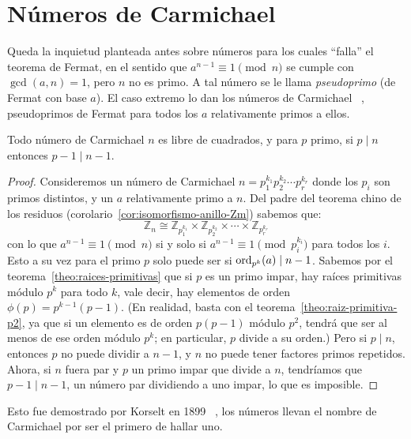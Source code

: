 \section{Números de Carmichael}
\label{sec:Carmichael}

  Queda la inquietud planteada antes
  sobre números para los cuales ``falla''
  el teorema de Fermat,%
  en el sentido que \(a^{n - 1} \equiv 1 \pmod{n}\)
  se cumple con \(\gcd(a, n) = 1\),
  pero \(n\) no es primo.
  A tal número se le llama \emph{pseudoprimo}%
  (de Fermat con base \(a\)).
  El caso extremo lo dan los números de Carmichael~%
    \cite{carmichael10:_note_new_number_theor_funct},
  pseudoprimos de Fermat
  para todos los \(a\) relativamente primos a ellos.

  \begin{theorem}
    Todo número de Carmichael \(n\) es libre de cuadrados,
    y para \(p\) primo,
    si \(p \mid n\) entonces \(p - 1 \mid n - 1\).
  \end{theorem}
  \begin{proof}
    Consideremos un número de Carmichael
    \(n = p_1^{k_1} p_2^{k_2} \dotsm p_r^{k_r}\)
    donde los \(p_i\) son primos distintos,
    y un \(a\) relativamente primo a \(n\).
    Del padre del teorema chino de los residuos%
    (corolario~\ref{cor:isomorfismo-anillo-Zm})
    sabemos que:
    \begin{equation*}
      \mathbb{Z}_n
	\cong \mathbb{Z}_{p_1^{k_1}}
		\times \mathbb{Z}_{p_2^{k_2}}
		\times \dotsb
		\times \mathbb{Z}_{p_r^{k_r}}
    \end{equation*}
    con lo que \(a^{n - 1} \equiv 1 \pmod{n}\)
    si y solo si \(a^{n - 1} \equiv 1 \pmod{p_i^{k_i}}\)
    para todos los \(i\).
    Esto a su vez para el primo \(p\)
    solo puede ser si \(\operatorname{ord}_{p^k}(a) \mid n - 1\).
    Sabemos por el teorema~\ref{theo:raices-primitivas}%
    que si \(p\) es un primo impar,
    hay raíces primitivas módulo \(p^k\) para todo \(k\),
    vale decir,
    hay elementos de orden \(\phi(p) = p^{k - 1} (p - 1)\).
    (En realidad,
     basta con el teorema~\ref{theo:raiz-primitiva-p2},
     ya que si un elemento es de orden \(p (p - 1)\) módulo \(p^2\),
     tendrá que ser al menos de ese orden módulo \(p^k\);
     en particular,
     \(p\) divide a su orden.)
    Pero si \(p \mid n\),
    entonces \(p\) no puede dividir a \(n - 1\),
    y \(n\) no puede tener factores primos repetidos.
    Ahora,
    si \(n\) fuera par y \(p\) un primo impar que divide a \(n\),
    tendríamos que \(p - 1 \mid n - 1\),
    un número par dividiendo a uno impar,
    lo que es imposible.
  \end{proof}
  Esto fue demostrado por Korselt en 1899~%
    \cite{korselt99:_probl_chinois},
  los números llevan el nombre de Carmichael
  por ser el primero de hallar uno.

